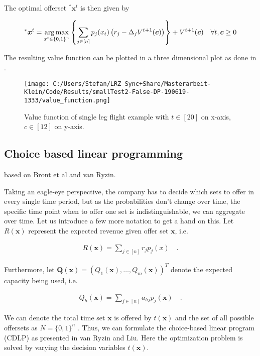 The optimal offerset $^*\boldsymbol{x}^t$ is then given by

\begin{align}
	^*\boldsymbol{x}^t = \operatorname*{arg\,max}_{x^t \in \{0,1\}^n}\left\{ \sum_{j \in [n]} p_j(x_t) \left( r_j - \Delta_j V^{t+1}(\boldsymbol{c}) \right) \right\} + V^{t+1}(\boldsymbol{c})\quad \forall t, \boldsymbol{c} \geq 0
\end{align}

The resulting value function can be plotted in a three dimensional plot as done in .

\begin{figure}
\caption{\label{fig-valueFunc} Value function of single leg flight example with $t \in [20]$ on x-axis, $c \in [12]$ on y-axis.}
\texttt{[image: C:/Users/Stefan/LRZ Sync+Share/Masterarbeit-Klein/Code/Results/smallTest2-False-DP-190619-1333/value\_function.png]}
\end{figure}

\subsection{Choice based linear programming}

based on Bront et al and van Ryzin.

Taking an eagle-eye perspective, the company has to decide which sets to offer in every single time period, but as the probabilities don't change over time, the specific time point when to offer one set is indistinguishable, we can aggregate over time. Let us introduce a few more notation to get a hand on this. Let $R(\mathbf{x})$ represent the expected revenue given offer set $\boldsymbol{x}$, i.e.

\begin{align}
	R(\boldsymbol{x}) = \sum_{j \in [n]} r_j p_j(x) \quad.
\end{align}

Furthermore, let $\boldsymbol{Q}(\boldsymbol{x}) = (Q_1(\boldsymbol{x}), \dots, Q_m(\boldsymbol{x}))^T$ denote the expected capacity being used, i.e. 

\begin{align}
	Q_h(\boldsymbol{x}) = \sum_{j \in [n]} a_{hj} p_j(\boldsymbol{x}) \quad.
\end{align}

We can denote the total time set $\boldsymbol{x}$ is offered by $t(\boldsymbol{x})$ and the set of all possible offersets as $N = \{0,1\}^n$ . Thus, we can formulate the choice-based linear program (CDLP)  as presented in van Ryzin and Liu. Here the optimization problem is solved by varying the decision variables $t(\boldsymbol{x})$.

